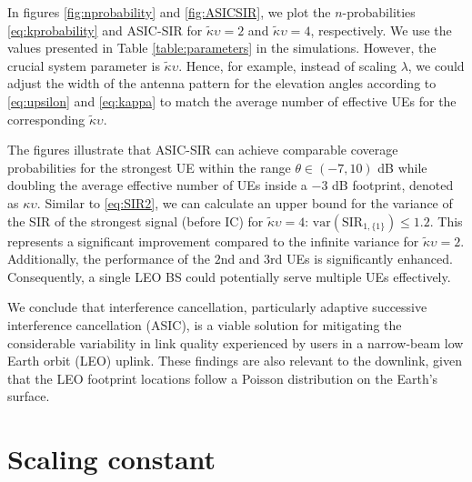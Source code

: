\documentclass[lettersize,journal]{IEEEtran}
\begin{document}
In figures \ref{fig:nprobability} and \ref{fig:ASICSIR}, we plot the $n$-probabilities \eqref{eq:kprobability} and ASIC-SIR for $\tilde{\kappa}\upsilon=2$ and  $\tilde{\kappa}\upsilon=4$, respectively. We use the values presented in Table \ref{table:parameters} in the simulations. However, the crucial system parameter is $\tilde{\kappa}\upsilon$. Hence, for example, instead of scaling $\lambda$, we could adjust the width of the antenna pattern for the elevation angles according to \eqref{eq:upsilon} and \eqref{eq:kappa} to match the average number of effective UEs for the corresponding $\tilde{\kappa} \upsilon$.

The figures illustrate that ASIC-SIR can achieve comparable coverage probabilities for the strongest UE within the range $\theta \in (-7,10)$ dB while doubling the average effective number of UEs inside a $-3$ dB footprint, denoted as $\kappa \upsilon$. Similar to \eqref{eq:SIR2}, we can calculate an upper bound for the variance of the SIR of the strongest signal (before IC) for $\tilde{\kappa} \upsilon = 4$: $\text{var}(\text{SIR}_{1,\{1\}}) \leq 1.2$. This represents a significant improvement compared to the infinite variance for $\tilde{\kappa} \upsilon = 2$. Additionally, the performance of the $2$nd and $3$rd UEs is significantly enhanced. Consequently, a single LEO BS could potentially serve multiple UEs effectively.

We conclude that interference cancellation, particularly adaptive successive interference cancellation (ASIC), is a viable solution for mitigating the considerable variability in link quality experienced by users in a narrow-beam low Earth orbit (LEO) uplink. These findings are also relevant to the downlink, given that the LEO footprint locations follow a Poisson distribution on the Earth's surface.








\appendices




\section{Scaling constant}







%

\end{document}
